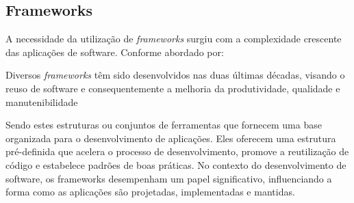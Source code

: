 \subsection{Frameworks}
A necessidade da utilização de \textit{frameworks} surgiu com a complexidade crescente das aplicações de software.
Conforme abordado por: 
\begin{citacao}
	\cite{maldonado2002padroes} 
	Diversos \textit{frameworks} têm sido desenvolvidos nas duas últimas décadas, visando o
	reuso de software e consequentemente a melhoria da produtividade, qualidade e
	manutenibilidade
\end{citacao}
Sendo estes estruturas ou conjuntos de ferramentas que fornecem uma base organizada para o desenvolvimento de aplicações. Eles oferecem uma estrutura pré-definida que acelera o processo de desenvolvimento, promove a reutilização de código e estabelece padrões de boas práticas. No contexto do desenvolvimento de software, os frameworks desempenham um papel significativo, influenciando a forma como as aplicações são projetadas, implementadas e mantidas.\cite{maldonado2002padroes}


